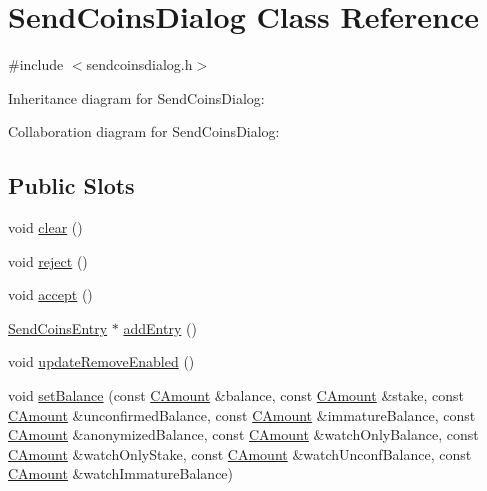 \hypertarget{class_send_coins_dialog}{}\section{Send\+Coins\+Dialog Class Reference}
\label{class_send_coins_dialog}


{\ttfamily \#include $<$sendcoinsdialog.\+h$>$}



Inheritance diagram for Send\+Coins\+Dialog\+:


Collaboration diagram for Send\+Coins\+Dialog\+:
\subsection*{Public Slots}
\begin{DoxyCompactItemize}
\item 
void \hyperlink{class_send_coins_dialog_a127bddff45f49ff5e6e263efe218ae26}{clear} ()
\item 
void \hyperlink{class_send_coins_dialog_a4879553d77d29f522ac92ac04580f4ad}{reject} ()
\item 
void \hyperlink{class_send_coins_dialog_af2185c3d29e43d37c30669f0def46060}{accept} ()
\item 
\hyperlink{class_send_coins_entry}{Send\+Coins\+Entry} $\ast$ \hyperlink{class_send_coins_dialog_a3d680a76b967641115c6ff2fa83fb62a}{add\+Entry} ()
\item 
void \hyperlink{class_send_coins_dialog_a62cbf7e0adc3caf4b4821f7a692ac175}{update\+Remove\+Enabled} ()
\item 
void \hyperlink{class_send_coins_dialog_a7f02f2589cb65b508ccb3b02aad06979}{set\+Balance} (const \hyperlink{amount_8h_a4eaf3a5239714d8c45b851527f7cb564}{C\+Amount} \&balance, const \hyperlink{amount_8h_a4eaf3a5239714d8c45b851527f7cb564}{C\+Amount} \&stake, const \hyperlink{amount_8h_a4eaf3a5239714d8c45b851527f7cb564}{C\+Amount} \&unconfirmed\+Balance, const \hyperlink{amount_8h_a4eaf3a5239714d8c45b851527f7cb564}{C\+Amount} \&immature\+Balance, const \hyperlink{amount_8h_a4eaf3a5239714d8c45b851527f7cb564}{C\+Amount} \&anonymized\+Balance, const \hyperlink{amount_8h_a4eaf3a5239714d8c45b851527f7cb564}{C\+Amount} \&watch\+Only\+Balance, const \hyperlink{amount_8h_a4eaf3a5239714d8c45b851527f7cb564}{C\+Amount} \&watch\+Only\+Stake, const \hyperlink{amount_8h_a4eaf3a5239714d8c45b851527f7cb564}{C\+Amount} \&watch\+Unconf\+Balance, const \hyperlink{amount_8h_a4eaf3a5239714d8c45b851527f7cb564}{C\+Amount} \&watch\+Immature\+Balance)
\end{DoxyCompactItemize}
